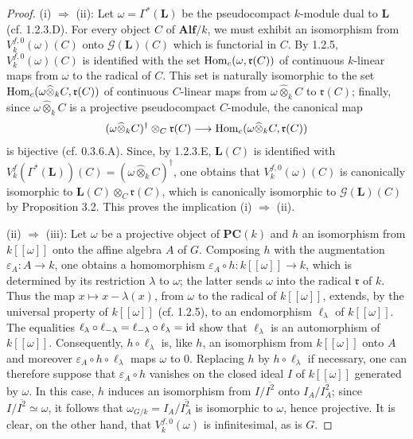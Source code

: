 \begin{proof}
(i) $\Rightarrow$ (ii): Let $\omega=\Gamma^*(\mathbf L)$ be the pseudocompact $k$-module dual to $\mathbf L$ (cf. 1.2.3.D). For every object $C$ of $\mathbf{Alf}/k$, we must exhibit an isomorphism from $V_k^{f,0}(\omega)(C)$ onto $\mathscr G(\mathbf L)(C)$ which is functorial in $C$. By 1.2.5, $V_k^{f,0}(\omega)(C)$ is identified with the set $\operatorname{Hom}_c(\omega,\mathfrak r(C))$ of continuous $k$-linear maps from $\omega$ to the radical of $C$. This set is naturally isomorphic to the set $\operatorname{Hom}_c(\omega\widehat\otimes_k C,\mathfrak r(C))$ of continuous $C$-linear maps from $\omega\widehat\otimes_k C$ to $\mathfrak r(C)$; finally, since $\omega\widehat\otimes_k C$ is a projective pseudocompact $C$-module, the canonical map
\[
(\omega\widehat\otimes_k C)^\dagger\otimes_C\mathfrak r(C)\longrightarrow\operatorname{Hom}_c(\omega\widehat\otimes_k C,\mathfrak r(C))
\]
is bijective (cf. 0.3.6.A). Since, by 1.2.3.E, $\mathbf L(C)$ is identified with $V_k^f(\Gamma^*(\mathbf L))(C)=(\omega\widehat\otimes_k C)^\dagger$, one obtains that $V_k^{f,0}(\omega)(C)$ is canonically isomorphic to $\mathbf L(C)\otimes_C\mathfrak r(C)$, which is canonically isomorphic to $\mathscr G(\mathbf L)(C)$ by Proposition 3.2. This proves the implication (i) $\Rightarrow$ (ii).

(ii) $\Rightarrow$ (iii): Let $\omega$ be a projective object of $\mathbf{PC}(k)$ and $h$ an isomorphism from $k[[\omega]]$ onto the affine algebra $A$ of $G$. Composing $h$ with the augmentation $\varepsilon_A:A\to k$, one obtains a homomorphism $\varepsilon_A\circ h:k[[\omega]]\to k$, which is determined by its restriction $\lambda$ to $\omega$; the latter sends $\omega$ into the radical $\mathfrak r$ of $k$. Thus the map $x\mapsto x-\lambda(x)$, from $\omega$ to the radical of $k[[\omega]]$, extends, by the universal property of $k[[\omega]]$ (cf. 1.2.5), to an endomorphism $\ell_\lambda$ of $k[[\omega]]$. The equalities $\ell_\lambda\circ\ell_{-\lambda}=\ell_{-\lambda}\circ\ell_\lambda=\mathrm{id}$ show that $\ell_\lambda$ is an automorphism of $k[[\omega]]$. Consequently, $h\circ\ell_\lambda$ is, like $h$, an isomorphism from $k[[\omega]]$ onto $A$ and moreover $\varepsilon_A\circ h\circ\ell_\lambda$ maps $\omega$ to $0$. Replacing $h$ by $h\circ\ell_\lambda$ if necessary, one can therefore suppose that $\varepsilon_A\circ h$ vanishes on the closed ideal $I$ of $k[[\omega]]$ generated by $\omega$. In this case, $h$ induces an isomorphism from $I/\overline{I^2}$ onto $I_A/\overline{I_A^2}$; since $I/\overline{I^2}\simeq\omega$, it follows that $\omega_{G/k}=I_A/\overline{I_A^2}$ is isomorphic to $\omega$, hence projective. It is clear, on the other hand, that $V_k^{f,0}(\omega)$ is infinitesimal, as is $G$.


\end{proof}
